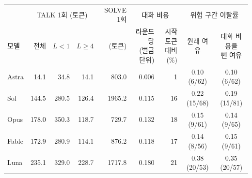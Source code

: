 \begin{tabular*}{\textwidth}{@{\extracolsep{\fill}}lrrrrrrcc@{}}
\toprule
 & \multicolumn{3}{c}{TALK 1회 (토큰)} & SOLVE 1회 & \multicolumn{2}{c}{대화 비용} & \multicolumn{2}{c}{위험 구간 이탈률} \\
\cmidrule(lr){2-4}\cmidrule(lr){5-5}\cmidrule(lr){6-7}\cmidrule(l){8-9}
모델 & 전체 & $L<1$ & $L\geq4$ & (토큰) & \shortstack{라운드당\\(벌금 단위)} & \shortstack{시작 토큰\\대비 (\%)} & 원래 여유 & \shortstack{대화 비용을\\뺀 여유} \\
\midrule
Astra & 14.1 & 34.8 & 14.1 & 803.0 & 0.006 & 1 & 0.10 (6/62) & 0.10 (6/62) \\
Sol & 144.5 & 280.5 & 126.4 & 1965.2 & 0.115 & 16 & 0.22 (15/68) & 0.19 (15/81) \\
Opus & 178.0 & 350.3 & 118.7 & 729.7 & 0.132 & 18 & 0.15 (9/61) & 0.14 (9/65) \\
Fable & 172.9 & 280.9 & 114.1 & 876.2 & 0.118 & 17 & 0.14 (8/56) & 0.15 (9/61) \\
Luna & 235.1 & 329.0 & 228.7 & 1717.8 & 0.180 & 21 & 0.38 (20/53) & 0.35 (20/57) \\
\bottomrule
\end{tabular*}
